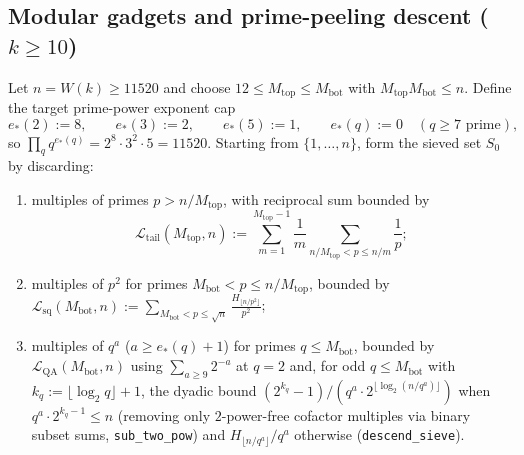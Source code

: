 \documentclass[11pt,a4paper]{amsart}
\theoremstyle{remark}
\begin{document}
\subsection*{\texorpdfstring{Modular gadgets and prime-peeling descent ($k \ge 10$)}{Modular gadgets and prime-peeling descent (k >= 10)}}
Let $n = W(k) \ge 11520$ and choose $12 \le M_{\mathrm{top}} \le M_{\mathrm{bot}}$ with $M_{\mathrm{top}} M_{\mathrm{bot}} \le n$. Define the target prime-power exponent cap
\[
e_*(2) := 8, \qquad e_*(3) := 2, \qquad e_*(5) := 1, \qquad e_*(q) := 0 \quad (q \ge 7 \text{ prime}),
\]
so $\prod_q q^{e_*(q)} = 2^8 \cdot 3^2 \cdot 5 = 11520$. Starting from $\{1, \dots, n\}$, form the sieved set $S_0$ by discarding:
\begin{enumerate}
\item multiples of primes $p > n / M_{\mathrm{top}}$, with reciprocal sum bounded by
\[
\mathcal{L}_{\mathrm{tail}}(M_{\mathrm{top}}, n) := \sum_{m=1}^{M_{\mathrm{top}} - 1} \frac{1}{m} \sum_{n / M_{\mathrm{top}} < p \le n / m} \frac{1}{p};
\]
\item multiples of $p^2$ for primes $M_{\mathrm{bot}} < p \le n / M_{\mathrm{top}}$, bounded by $\mathcal{L}_{\mathrm{sq}}(M_{\mathrm{bot}}, n) := \sum_{M_{\mathrm{bot}} < p \le \sqrt{n}} \frac{H_{\lfloor n / p^2 \rfloor}}{p^2}$;
\item multiples of $q^a$ ($a \ge e_*(q) + 1$) for primes $q \le M_{\mathrm{bot}}$, bounded by $\mathcal{L}_{\mathrm{QA}}(M_{\mathrm{bot}}, n)$ using $\sum_{a \ge 9} 2^{-a}$ at $q = 2$ and, for odd $q \le M_{\mathrm{bot}}$ with $k_q := \lfloor \log_2 q \rfloor + 1$, the dyadic bound $(2^{k_q} - 1)/(q^a \cdot 2^{\lfloor \log_2(n/q^a) \rfloor})$ when $q^a \cdot 2^{k_q - 1} \le n$ (removing only $2$-power-free cofactor multiples via binary subset sums, \texttt{sub\_two\_pow}) and $H_{\lfloor n / q^a \rfloor} / q^a$ otherwise (\texttt{descend\_sieve}).
\end{enumerate}
\end{document}
